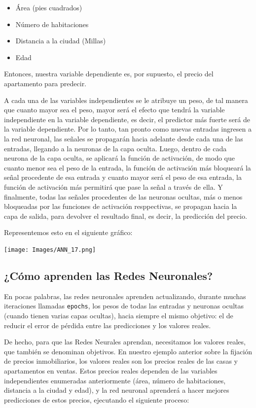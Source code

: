 \documentclass[
]{book}
\providecommand{\tightlist}{%
  \setlength{\itemsep}{0pt}\setlength{\parskip}{0pt}}
\begin{document}
\begin{itemize}
\tightlist
\item
  Área (pies cuadrados)
\item
  Número de habitaciones
\item
  Distancia a la ciudad (Millas)
\item
  Edad
\end{itemize}

Entonces, nuestra variable dependiente es, por supuesto, el precio del apartamento para predecir.

A cada una de las variables independientes se le atribuye un peso, de tal manera que cuanto mayor sea el peso, mayor será el efecto que tendrá la variable independiente en la variable dependiente, es decir, el predictor más fuerte será de la variable dependiente. Por lo tanto, tan pronto como nuevas entradas ingresen a la red neuronal, las señales se propagarán hacia adelante desde cada una de las entradas, llegando a la neuronas de la capa oculta. Luego, dentro de cada neurona de la capa oculta, se aplicará la función de activación, de modo que cuanto menor sea el peso de la entrada, la función de activación más bloqueará la señal procedente de esa entrada y cuanto mayor será el peso de esa entrada, la función de activación más permitirá que pase la señal a través de ella. Y finalmente, todas las señales procedentes de las neuronas ocultas, más o menos bloqueadas por las funciones de activación resppectivas, se propagan hacia la capa de salida, para devolver el resultado final, es decir, la predicción del precio.

Representemos esto en el siguiente gráfico:

\texttt{[image: Images/ANN\_17.png]}

\hypertarget{cuxf3mo-aprenden-las-redes-neuronales}{%
\subsection{¿Cómo aprenden las Redes Neuronales?}\label{cuxf3mo-aprenden-las-redes-neuronales}}

En pocas palabras, las redes neuronales aprenden actualizando, durante muchas iteraciones llamadas \texttt{epochs}, los pesos de todas las entradas y neuronas ocultas (cuando tienen varias capas ocultas), hacia siempre el mismo objetivo: el de reducir el error de pérdida entre las predicciones y los valores reales.

De hecho, para que las Redes Neurales aprendan, necesitamos los valores reales, que también se denominan objetivos. En nuestro ejemplo anterior sobre la fijación de precios inmobiliarios, los valores reales son los precios reales de las casas y apartamentos en ventas. Estos precios reales dependen de las variables independientes enumeradas anteriormente (área, número de habitaciones, distancia a la ciudad y edad), y la red neuronal aprenderá a hacer mejores predicciones de estos precios, ejecutando el siguiente proceso:
\end{document}

